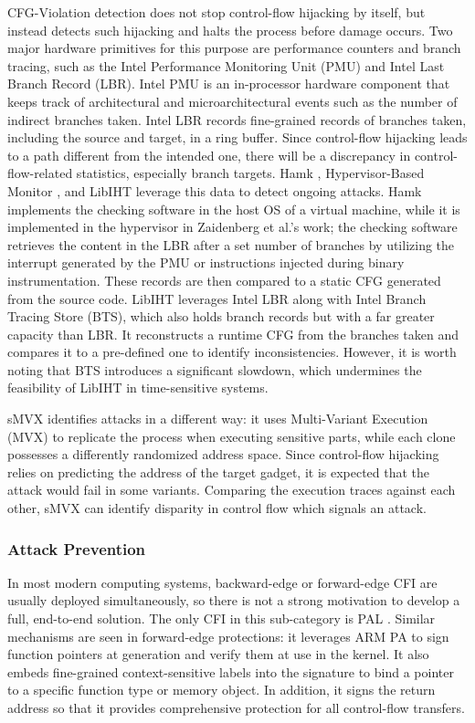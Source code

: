 \documentclass[journal,onecolumn]{IEEEtran}
\begin{document}
CFG-Violation detection does not stop control-flow hijacking by itself, but instead detects such hijacking and halts the process before damage occurs. Two major hardware primitives for this purpose are performance counters and branch tracing, such as the Intel Performance Monitoring Unit (PMU) and Intel Last Branch Record (LBR). Intel PMU is an in-processor hardware component that keeps track of architectural and microarchitectural events such as the number of indirect branches taken\cite{IntelPMU}. Intel LBR records fine-grained records of branches taken, including the source and target, in a ring buffer\cite{IntelLBR}. Since control-flow hijacking leads to a path different from the intended one, there will be a discrepancy in control-flow-related statistics, especially branch targets. Hamk \cite{Sun26}, Hypervisor-Based Monitor \cite{Zaidenberg26}, and LibIHT \cite{Zhao25} leverage this data to detect ongoing attacks. Hamk implements the checking software in the host OS of a virtual machine, while it is implemented in the hypervisor in Zaidenberg et al.'s work; the checking software retrieves the content in the LBR after a set number of branches by utilizing the interrupt generated by the PMU or instructions injected during binary instrumentation. These records are then compared to a static CFG generated from the source code. LibIHT leverages Intel LBR along with Intel Branch Tracing Store (BTS), which also holds branch records but with a far greater capacity than LBR. It reconstructs a runtime CFG from the branches taken and compares it to a pre-defined one to identify inconsistencies. However, it is worth noting that BTS introduces a significant slowdown\cite{intel2015realtime}, which undermines the feasibility of LibIHT in time-sensitive systems.

sMVX \cite{Yeoh24} identifies attacks in a different way: it uses Multi-Variant Execution (MVX) to replicate the process when executing sensitive parts, while each clone possesses a differently randomized address space. Since control-flow hijacking relies on predicting the address of the target gadget, it is expected that the attack would fail in some variants. Comparing the execution traces against each other, sMVX can identify disparity in control flow which signals an attack.

\subsubsection{Attack Prevention}

In most modern computing systems, backward-edge or forward-edge CFI are usually deployed simultaneously, so there is not a strong motivation to develop a full, end-to-end solution. The only CFI in this sub-category is PAL \cite{Yoo22}. Similar mechanisms are seen in forward-edge protections: it leverages ARM PA to sign function pointers at generation and verify them at use in the kernel. It also embeds fine-grained context-sensitive labels into the signature to bind a pointer to a specific function type or memory object. In addition, it signs the return address so that it provides comprehensive protection for all control-flow transfers.
\end{document}
